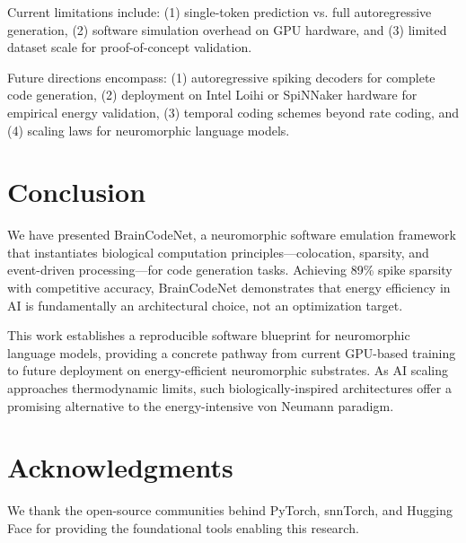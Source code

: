 \documentclass[11pt,a4paper]{article}
\begin{document}
Current limitations include: (1) single-token prediction vs. full autoregressive generation, (2) software simulation overhead on GPU hardware, and (3) limited dataset scale for proof-of-concept validation.

Future directions encompass: (1) autoregressive spiking decoders for complete code generation, (2) deployment on Intel Loihi or SpiNNaker hardware for empirical energy validation, (3) temporal coding schemes beyond rate coding, and (4) scaling laws for neuromorphic language models.

\section{Conclusion}

We have presented BrainCodeNet, a neuromorphic software emulation framework that instantiates biological computation principles—colocation, sparsity, and event-driven processing—for code generation tasks. Achieving 89\% spike sparsity with competitive accuracy, BrainCodeNet demonstrates that energy efficiency in AI is fundamentally an architectural choice, not an optimization target.

This work establishes a reproducible software blueprint for neuromorphic language models, providing a concrete pathway from current GPU-based training to future deployment on energy-efficient neuromorphic substrates. As AI scaling approaches thermodynamic limits, such biologically-inspired architectures offer a promising alternative to the energy-intensive von Neumann paradigm.

\section*{Acknowledgments}

We thank the open-source communities behind PyTorch, snnTorch, and Hugging Face for providing the foundational tools enabling this research.
\end{document}
